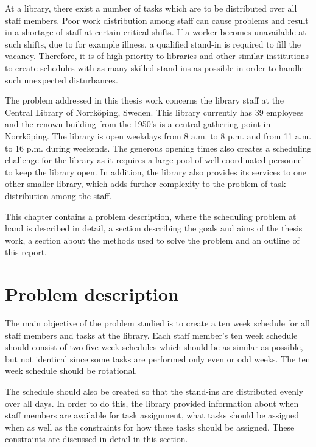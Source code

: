 
At a library, there exist a number of tasks which are to be distributed over all staff members. Poor work distribution among staff can cause problems and result in a shortage of staff at certain critical shifts. If a worker becomes unavailable at such shifts, due to for example illness, a qualified stand-in is required to fill the vacancy. Therefore, it is of high priority to libraries and other similar institutions to create schedules with as many skilled stand-ins as possible in order to handle such unexpected disturbances. 

The problem addressed in this thesis work concerns the library staff at the Central Library of Norrköping, Sweden. This library currently has 39 employees and the renown building from the 1950's is a central gathering point in Norrköping. The library is open weekdays from 8 a.m. to 8 p.m. and from 11 a.m. to 16 p.m. during weekends. The generous opening times also creates a scheduling challenge for the library as it requires a large pool of well coordinated personnel to keep the library open. In addition, the library also provides its services to one other smaller library, which adds further complexity to the problem of task distribution among the staff.

This chapter contains a problem description, where the scheduling problem at hand is described in detail, a section describing the goals and aims of the thesis work, a section about the methods used to solve the problem and an outline of this report.

\section{Problem description}

The main objective of the problem studied is to create a ten week schedule for all staff members and tasks at the library. Each staff member's ten week schedule should consist of two five-week schedules which should be as similar as possible, but not identical since some tasks are performed only even or odd weeks. The ten week schedule should be rotational.

The schedule should also be created so that the stand-ins are distributed evenly over all days. In order to do this, the library provided information about when staff members are available for task assignment, what tasks should be assigned when as well as the constraints for how these tasks should be assigned. These constraints are discussed in detail in this section.

